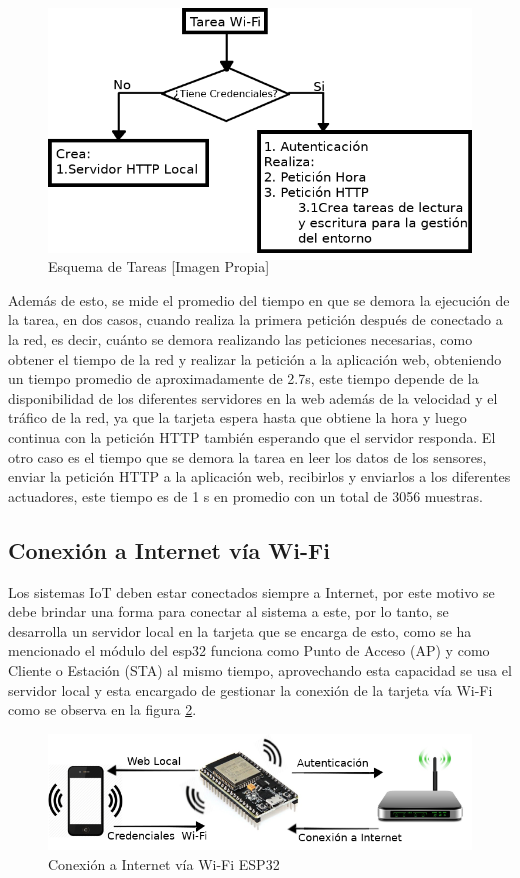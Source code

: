\begin{figure}[H]
	\centering
	\caption{Esquema de Tareas [Imagen Propia]}
	\label{fig:tareas}
	\includegraphics[width=0.7\linewidth]{Imagenes/tareas}
\end{figure}

Además de esto, se mide el promedio del tiempo en que se demora la ejecución de la tarea, en dos casos, cuando realiza la primera petición después de conectado a la red, es decir, cuánto se demora realizando las peticiones necesarias, como obtener el tiempo de la red y realizar la petición a la aplicación web, obteniendo un tiempo promedio de aproximadamente de 2.7s, este tiempo depende de la disponibilidad de los diferentes servidores en la web además de la velocidad y el tráfico de la red, ya que la tarjeta espera hasta que obtiene la hora y luego continua con la petición HTTP también esperando que el servidor responda. El otro caso es el tiempo que se demora la tarea en leer los datos de los sensores, enviar la petición HTTP a la aplicación web, recibirlos y enviarlos a los diferentes actuadores, este tiempo es de 1 s en promedio con un total de 3056 muestras.

\subsection{Conexión a Internet vía Wi-Fi}\label{sub:wifi}

Los sistemas IoT deben estar conectados siempre a Internet, por este motivo se debe brindar una forma para conectar al sistema a este, por lo tanto, se desarrolla un servidor local en la tarjeta que se encarga de esto, como se ha mencionado el módulo del esp32 funciona como Punto de Acceso (AP) y como Cliente o Estación (STA) al mismo tiempo, aprovechando esta capacidad se usa el servidor local y esta encargado de gestionar la conexión de la tarjeta vía Wi-Fi como se observa en la figura \ref{fig:conexion}.\\

\begin{figure}[H]
	\centering
	\caption{Conexión a Internet vía Wi-Fi ESP32}
	\label{fig:conexion}
	\includegraphics[width=0.7\linewidth]{Imagenes/conexion}
\end{figure}


